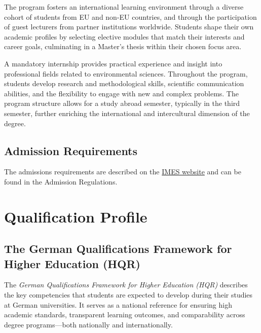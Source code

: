 \documentclass[
  letterpaper,
  10pt,
  openany]{book}
\begin{document}
The program fosters an international learning environment through a
diverse cohort of students from EU and non-EU countries, and through the
participation of guest lecturers from partner institutions worldwide.
Students shape their own academic profiles by selecting elective modules
that match their interests and career goals, culminating in a Master's
thesis within their chosen focus area.

A mandatory internship provides practical experience and insight into
professional fields related to environmental sciences. Throughout the
program, students develop research and methodological skills, scientific
communication abilities, and the flexibility to engage with new and
complex problems. The program structure allows for a study abroad
semester, typically in the third semester, further enriching the
international and intercultural dimension of the degree.

\section*{Admission Requirements}\label{admission-requirements}


The admissions requirements are described on the
\href{https://imes.uni-koeln.de/prospective-students/apply-for-the-imes-masters-program}{IMES
website} and can be found in the Admission Regulations.

\chapter*{Qualification Profile}\label{qualification-profile}


\section*{The German Qualifications Framework for Higher Education
(HQR)}\label{the-german-qualifications-framework-for-higher-education-hqr}


The \emph{German Qualifications Framework for Higher Education (HQR)}
describes the key competencies that students are expected to develop
during their studies at German universities. It serves as a national
reference for ensuring high academic standards, transparent learning
outcomes, and comparability across degree programs---both nationally and
internationally.
\end{document}
